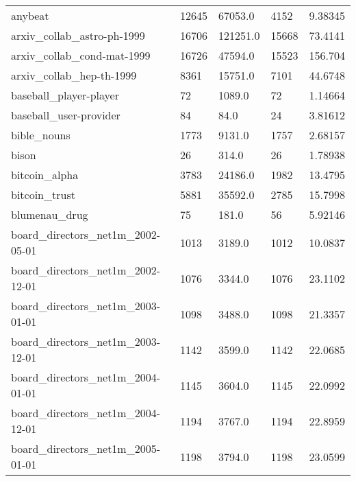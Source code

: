 \begin{longtable}{lllll}
 anybeat                                            & 12645      & 67053.0     & 4152  & 9.38345    \\
 arxiv\_collab\_astro-ph-1999                         & 16706      & 121251.0    & 15668 & 73.4141    \\
 arxiv\_collab\_cond-mat-1999                         & 16726      & 47594.0     & 15523 & 156.704    \\
 arxiv\_collab\_hep-th-1999                           & 8361       & 15751.0     & 7101  & 44.6748    \\
 baseball\_player-player                             & 72         & 1089.0      & 72    & 1.14664    \\
 baseball\_user-provider                             & 84         & 84.0        & 24    & 3.81612    \\
 bible\_nouns                                        & 1773       & 9131.0      & 1757  & 2.68157    \\
 bison                                              & 26         & 314.0       & 26    & 1.78938    \\
 bitcoin\_alpha                                      & 3783       & 24186.0     & 1982  & 13.4795    \\
 bitcoin\_trust                                      & 5881       & 35592.0     & 2785  & 15.7998    \\
 blumenau\_drug                                      & 75         & 181.0       & 56    & 5.92146    \\
 board\_directors\_net1m\_2002-05-01                   & 1013       & 3189.0      & 1012  & 10.0837    \\
 board\_directors\_net1m\_2002-12-01                   & 1076       & 3344.0      & 1076  & 23.1102    \\
 board\_directors\_net1m\_2003-01-01                   & 1098       & 3488.0      & 1098  & 21.3357    \\
 board\_directors\_net1m\_2003-12-01                   & 1142       & 3599.0      & 1142  & 22.0685    \\
 board\_directors\_net1m\_2004-01-01                   & 1145       & 3604.0      & 1145  & 22.0992    \\
 board\_directors\_net1m\_2004-12-01                   & 1194       & 3767.0      & 1194  & 22.8959    \\
 board\_directors\_net1m\_2005-01-01                   & 1198       & 3794.0      & 1198  & 23.0599    \\

\end{longtable}
